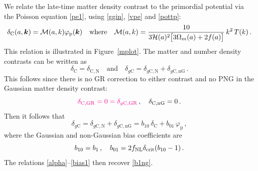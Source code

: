 {We relate the late-time matter density contrast  to the primordial potential via the Poisson equation \eqref{pe1}, using \eqref{ggin}, \eqref{vpe} and \eqref{pottp}:
\begin{align} \label{alpha}
\delta_{\mathrm{C}}(a,\bm {k})=  {\cal M} (a,k)  \varphi_{\mathrm{p}} (\bm {k}) \quad \mbox{where} \quad 
{{\cal M} (a,k)  = \frac{10}{3\mathcal{H}(a)^2\big[3\Omega_m(a) +2f(a) \big]}\,k^2 \, T(k)}\,.
\end{align}
This relation is illustrated in Figure~\ref{mplot}. 
{The matter and number density contrasts can be written as 
\begin{equation} \label{dcng}
\delta_{\mathrm{C}}= \delta_{\mathrm{C,N}} \quad \mbox{and}\quad
\delta_{g\mathrm{C}}= \delta_{g\mathrm{C,N}}+ \delta_{g\mathrm{C,nG}} \,.
\end{equation}
This follows since there is no GR correction to either contrast and no PNG in the Gaussian matter density contrast:}
\begin{equation} \label{dgro1}
{\color{magenta}{\delta_{{\mathrm{C,GR}}} = 0 =\delta_{g{\mathrm{C,GR}}}}}\,,\quad \delta_{{\mathrm{C,nG}}} =0\,.
\end{equation}
Then it follows that}
\begin{equation}\label{dg1b}
\delta_{g{\mathrm{C}}}= \delta_{g \mathrm{C,N}}+ \delta_{g{\mathrm{C,nG}}}=   b_{10}\,\delta_{\mathrm{C}}+ b_{01}\,\varphi_{\mathrm{p}}\,, 
\end{equation}
where the Gaussian and non-Gaussian  bias coefficients are 
\begin{equation}
\label{bias1}
b_{10}= b_1\,,\quad
b_{01}= 2f_\text{NL} \delta_{\mathrm{crit}}(b_{10}-1)\,.
\end{equation}
The relations \eqref{alpha}--\eqref{bias1} then recover \eqref{b1ng}.

